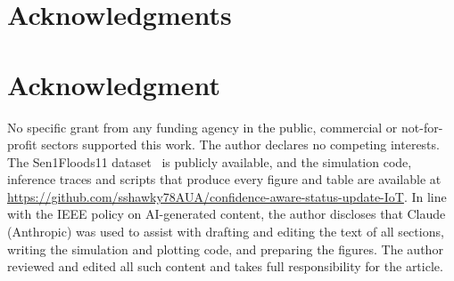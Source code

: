 \documentclass[10pt,journal,compsoc]{IEEEtran}
\theoremstyle{remark}
\begin{document}
\ifCLASSOPTIONcompsoc
  \section*{Acknowledgments}
\else
  \section*{Acknowledgment}
\fi
No specific grant from any funding agency in the public, commercial or not-for-profit sectors supported this work. The author declares no competing interests. The Sen1Floods11 dataset~\cite{bonafilia2020sen1floods11} is publicly available, and the simulation code, inference traces and scripts that produce every figure and table are available at \url{https://github.com/sshawky78AUA/confidence-aware-status-update-IoT}. In line with the IEEE policy on AI-generated content, the author discloses that Claude (Anthropic) was used to assist with drafting and editing the text of all sections, writing the simulation and plotting code, and preparing the figures. The author reviewed and edited all such content and takes full responsibility for the article.




\end{document}
